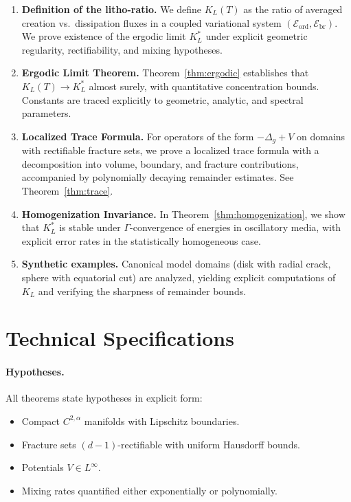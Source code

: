 \begin{enumerate}[label=\textbf{C\arabic*}.]
  \item \textbf{Definition of the litho-ratio.} 
  We define $K_L(T)$ as the ratio of averaged creation vs.\ dissipation 
  fluxes in a coupled variational system 
  $(\mathcal{E}_{\text{ord}}, \mathcal{E}_{\text{br}})$. 
  We prove existence of the ergodic limit $K_L^*$ under explicit geometric 
  regularity, rectifiability, and mixing hypotheses.
  
  \item \textbf{Ergodic Limit Theorem.} 
  Theorem~\ref{thm:ergodic} establishes that $K_L(T) \to K_L^*$ almost surely, 
  with quantitative concentration bounds. Constants are traced explicitly to 
  geometric, analytic, and spectral parameters.

  \item \textbf{Localized Trace Formula.}
  For operators of the form $-\Delta_g + V$ on domains with rectifiable 
  fracture sets, we prove a localized trace formula with a decomposition into 
  volume, boundary, and fracture contributions, accompanied by polynomially 
  decaying remainder estimates. See Theorem~\ref{thm:trace}.
  
  \item \textbf{Homogenization Invariance.}
  In Theorem~\ref{thm:homogenization}, we show that $K_L^*$ is stable under 
  $\Gamma$-convergence of energies in oscillatory media, with explicit error 
  rates in the statistically homogeneous case.

  \item \textbf{Synthetic examples.}
  Canonical model domains (disk with radial crack, sphere with equatorial cut) 
  are analyzed, yielding explicit computations of $K_L$ and verifying the sharpness 
  of remainder bounds.
\end{enumerate}

\section*{Technical Specifications}

\paragraph{Hypotheses.}
All theorems state hypotheses in explicit form:
\begin{itemize}
  \item Compact $C^{2,\alpha}$ manifolds with Lipschitz boundaries.
  \item Fracture sets $(d-1)$-rectifiable with uniform Hausdorff bounds.
  \item Potentials $V \in L^\infty$.
  \item Mixing rates quantified either exponentially or polynomially.
\end{itemize}

